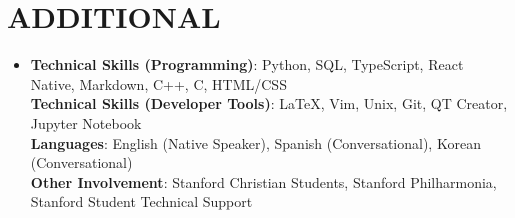 \documentclass[letterpaper,11pt]{article}
\begin{document}
    \section{\textbf{ADDITIONAL}}
 \begin{itemize}[leftmargin=0in, label={}]
    \item{
        \textbf{Technical Skills (Programming)}{: \small{Python, SQL, TypeScript, React Native, Markdown, C++, C, HTML/CSS}} \\
        \textbf{Technical Skills (Developer Tools)}{: \small{LaTeX, Vim, Unix, Git, QT Creator, Jupyter Notebook}} \\
        \textbf{Languages}{: \small{English (Native Speaker), Spanish (Conversational), Korean (Conversational)}} \\
        \textbf{Other Involvement}{: \small{Stanford Christian Students, Stanford Philharmonia, Stanford Student Technical Support}} \\
    }
 \end{itemize}
\end{document}
